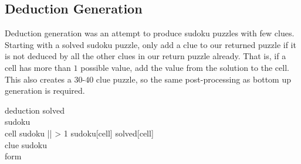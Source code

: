 \subsection{Deduction Generation}
Deduction generation was an attempt to produce sudoku puzzles with few clues. Starting with a solved sudoku puzzle, only add
a clue to our returned puzzle if it is not deduced by all the other clues in our return puzzle already. That is, if a cell has
more than $1$ possible value, add the value from the solution to the cell. This also creates a $30$-$40$ clue puzzle, so the same
post-processing as bottom up generation is required.
\begin{center}
\begin{pseudocode}[framebox]{deduction}{ }
    solved \GETS {}       \\
    sudoku \GETS {}       \\
    \FOR cell \in sudoku \DO
        \IF || > 1 \THEN
            sudoku[cell] \GETS solved[cell]         \\
    \FOR clue \in sudoku \DO \BEGIN
                  \\
        \IF form \neq {} \THEN
    \END                                            \\
    \label{algo:deduction}
\end{pseudocode}
\end{center}

